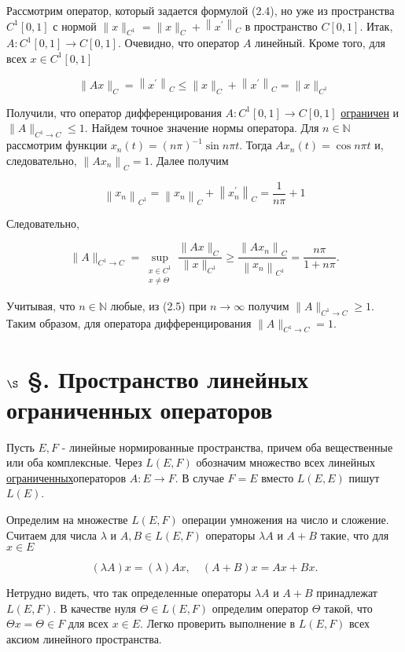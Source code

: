 \documentclass[a4paper, 12pt]{extarticle}
\begin{document}
Рассмотрим оператор, который задается формулой (2.4), но уже из пространства $C^{1}[0,1]$ с нормой $\|x\|_{C^{1}}=\|x\|_{C}+\left\|x^{\prime}\right\|_{C}$ в пространство $C[0,1]$. Итак, $A: C^{1}[0,1] \rightarrow C[0,1]$. Очевидно, что оператор $A$ линейный. Кроме того, для всех $x \in C^{1}[0,1]$

$$
	\|A x\|_{C}=\left\|x^{\prime}\right\|_{C} \leq\|x\|_{C}+\left\|x^{\prime}\right\|_{C}=\|x\|_{C^{1}}
$$

Получили, что оператор дифференцирования $A: C^{1}[0,1] \rightarrow C[0,1]$ \hyperlink{ogranichenn}{ограничен} и $\|A\|_{C^{1} \rightarrow C} \leq 1$. Найдем точное значение нормы оператора. Для $n \in \mathbb{N}$ рассмотрим функции $x_{n}(t)=(n \pi)^{-1} \sin n \pi t$. Тогда $A x_{n}(t)=\cos n \pi t$ и, следовательно, $\left\|A x_{n}\right\|_{C}=1$. Далее получим

$$
	\left\|x_{n}\right\|_{C^{1}}=\left\|x_{n}\right\|_{C}+\left\|x_{n}^{\prime}\right\|_{C}=\frac{1}{n \pi}+1
$$

Следовательно,

$$
	\|A\|_{C^{1} \rightarrow C}=\sup _{\substack{x \in C^{1} \\ x \neq \Theta}} \frac{\|A x\|_{C}}{\|x\|_{C^{1}}} \geq \frac{\left\|A x_{n}\right\|_{C}}{\left\|x_{n}\right\|_{C^{1}}}=\frac{n \pi}{1+n \pi} .
$$

Учитывая, что $n \in \mathbb{N}$ любые, из (2.5) при $n \rightarrow \infty$ получим $\|A\|_{C^{1} \rightarrow C} \geq 1$. Таким образом, для оператора дифференцирования $\|A\|_{C^{1} \rightarrow C}=1$.


\section*{$\S$ §. Пространство линейных ограниченных операторов}
Пусть $E, F$ - линейные нормированные пространства, причем оба вещественные или оба комплексные. Через $L(E, F)$ обозначим множество всех линейных \hyperlink{ogranichenn}{ограниченных}операторов $A: E \rightarrow F$. В случае $F=E$ вместо $L(E, E)$ пишут $L(E)$.

Определим на множестве $L(E, F)$ операции умножения на число и сложение. Считаем для числа $\lambda$ и $A, B \in L(E, F)$ операторы $\lambda A$ и $A+B$ такие, что для $x \in E$

$$
	(\lambda A) x=(\lambda) A x, \quad(A+B) x=A x+B x .
$$

Нетрудно видеть, что так определенные операторы $\lambda A$ и $A+B$ принадлежат $L(E, F)$. В качестве нуля $\Theta \in L(E, F)$ определим оператор $\Theta$ такой, что $\Theta x=\Theta \in F$ для всех $x \in E$. Легко проверить выполнение в $L(E, F)$ всех аксиом линейного пространства.
\end{document}
